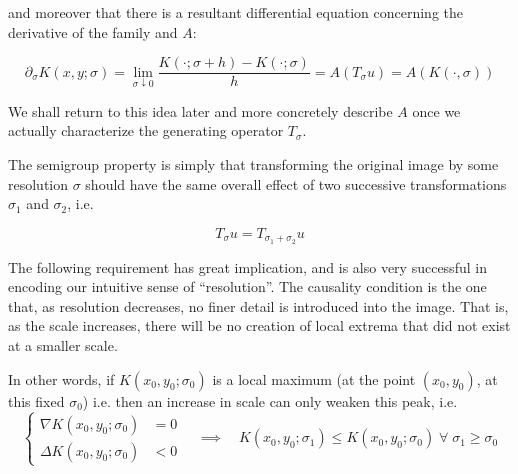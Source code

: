 	 and moreover that there is a resultant differential equation
	 concerning the derivative of the family and $A$:
	 
	 \begin{equation}
	 \partial_{\sigma} K(x,y;\sigma)
	 = \lim_{\sigma \downarrow 0}
	 \frac{K(\cdot;\sigma+h) - K(\cdot; \sigma)}{h}
	 = A(T_\sigma u) = A(K(\cdot,\sigma))
	 \end{equation}
	 
	 We shall return to this idea later and more concretely describe $A$ once we actually characterize the generating 
	 operator $T_\sigma$.
    
    \begin{axiom} \label{axiom:semigroup}
    The semigroup property is simply that transforming
    the original image by some resolution $\sigma$ should
    have the same overall effect of two successive
    transformations $\sigma_1$ and $\sigma_2$, i.e.
    
    \begin{equation}	
	    T_{\sigma} u = T_{\sigma_1 + \sigma_2} u
    \end{equation}
    \end{axiom}
   

   \begin{axiom} \label{axiom:causality}
    The following requirement has great implication, and is also
    very successful in encoding our intuitive sense
    of ``resolution''. The causality condition is the one
    that, as resolution decreases, no finer detail is
    introduced into the image. That is, as the scale
    increases, there will be no creation of local extrema
    that did not exist at a smaller scale.
    \end{axiom}
    In other words, if 
    $K(x_0,y_0 ; \sigma_0)$ is a local maximum (at the point $(x_0, y_0)$, at this fixed $\sigma_0$)
    i.e. 
    then an increase in scale can only weaken this peak, i.e.
    \begin{equation}
    \left\{\begin{aligned}
    \nabla K(x_0,y_0; \sigma_0) &= 0 \\
    \Delta K(x_0,y_0;\sigma_0) &< 0
    \end{aligned}\right.
	\quad \implies \quad
	K(x_0,y_0;\sigma_1) \le K(x_0,y_0;\sigma_0)
	\; \forall\; \sigma_1 \ge \sigma_0
    \end{equation}
    
